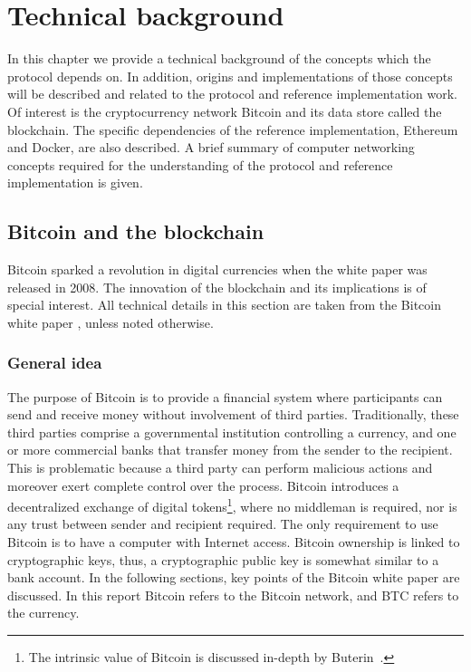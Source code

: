 \chapter{Technical background}
In this chapter we provide a technical background of the concepts which the protocol depends on. In addition, origins and implementations of those concepts will be described and related to the protocol and reference implementation work. Of interest is the cryptocurrency network Bitcoin and its data store called the blockchain. The specific dependencies of the reference implementation, Ethereum and Docker, are also described. A brief summary of computer networking concepts required for the understanding of the protocol and reference implementation is given.

\section{Bitcoin and the blockchain}
Bitcoin sparked a revolution in digital currencies when the white paper was released in 2008. The innovation of the blockchain and its implications is of special interest. All technical details in this section are taken from the Bitcoin white paper \cite{btc}, unless noted otherwise.

\subsection{General idea}
The purpose of Bitcoin is to provide a financial system where participants can send and receive money without involvement of third parties. Traditionally, these third parties comprise a governmental institution controlling a currency, and one or more commercial banks that transfer money from the sender to the recipient. This is problematic because a third party can perform malicious actions and moreover exert complete control over the process. Bitcoin introduces a decentralized exchange of digital tokens\footnote{The intrinsic value of Bitcoin is discussed in-depth by Buterin~\cite{buterin:2011}.}, where no middleman is required, nor is any trust between sender and recipient required. The only requirement to use Bitcoin is to have a computer with Internet access. Bitcoin ownership is linked to cryptographic keys, thus, a cryptographic public key is somewhat similar to a bank account. In the following sections, key points of the Bitcoin white paper are discussed. In this report Bitcoin refers to the Bitcoin network, and BTC refers to the currency.

